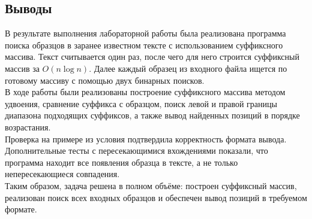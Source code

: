 \documentclass[12pt]{article}
\begin{document}
\subsection*{Выводы}
\hspace{2ex}
В результате выполнения лабораторной работы была реализована программа поиска образцов в заранее известном тексте с использованием суффиксного массива. Текст считывается один раз, после чего для него строится суффиксный массив за $O(n \log n)$. Далее каждый образец из входного файла ищется по готовому массиву с помощью двух бинарных поисков. \\

В ходе работы были реализованы построение суффиксного массива методом удвоения, сравнение суффикса с образцом, поиск левой и правой границы диапазона подходящих суффиксов, а также вывод найденных позиций в порядке возрастания. \\

Проверка на примере из условия подтвердила корректность формата вывода. Дополнительные тесты с пересекающимися вхождениями показали, что программа находит все появления образца в тексте, а не только непересекающиеся совпадения. \\

Таким образом, задача решена в полном объёме: построен суффиксный массив, реализован поиск всех входных образцов и обеспечен вывод позиций в требуемом формате.
\end{document}
